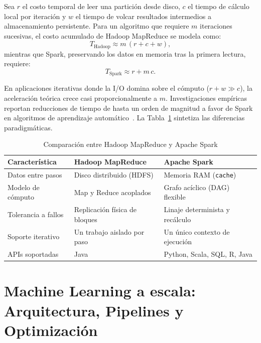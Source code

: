\documentclass[conference,a4paper]{IEEEtran}
\begin{document}
Sea $r$ el costo temporal de leer una partición desde disco, $c$ el tiempo de cálculo local por iteración y $w$ el tiempo de volcar resultados intermedios a almacenamiento persistente. Para un algoritmo que requiere $m$ iteraciones sucesivas, el costo acumulado de Hadoop MapReduce se modela como:
\begin{equation}
T_{\text{Hadoop}} \approx m\,(r + c + w),
\end{equation}
mientras que Spark, preservando los datos en memoria tras la primera lectura, requiere:
\begin{equation}
T_{\text{Spark}} \approx r + m\,c .
\end{equation}

En aplicaciones iterativas donde la I/O domina sobre el cómputo ($r + w \gg c$), la aceleración teórica crece casi proporcionalmente a $m$. Investigaciones empíricas reportan reducciones de tiempo de hasta un orden de magnitud a favor de Spark en algoritmos de aprendizaje automático~\cite{zaharia2012rdd}. La Tabla~\ref{tab:comparacion} sintetiza las diferencias paradigmáticas.

\begin{table}[t]
\caption{Comparación entre Hadoop MapReduce y Apache Spark}
\label{tab:comparacion}
\centering
\footnotesize
\begin{tabular}{@{}>{\raggedright\arraybackslash}p{1.8cm}>{\raggedright\arraybackslash}p{2.5cm}>{\raggedright\arraybackslash}p{2.5cm}@{}}
\toprule
\textbf{Característica} & \textbf{Hadoop MapReduce} & \textbf{Apache Spark} \\
\midrule
Datos entre pasos & Disco distribuido (HDFS) & Memoria RAM (\texttt{cache}) \\
Modelo de cómputo & Map y Reduce acoplados & Grafo acíclico (DAG) flexible \\
Tolerancia a fallos & Replicación física de bloques & Linaje determinista y recálculo \\
Soporte iterativo & Un trabajo aislado por paso & Un único contexto de ejecución \\
APIs soportadas & Java & Python, Scala, SQL, R, Java \\
\bottomrule
\end{tabular}
\vspace{-5pt}
\end{table}

\section{Machine Learning a escala: Arquitectura, Pipelines y Optimización}
\label{sec:mllib-avanzado}
\end{document}
